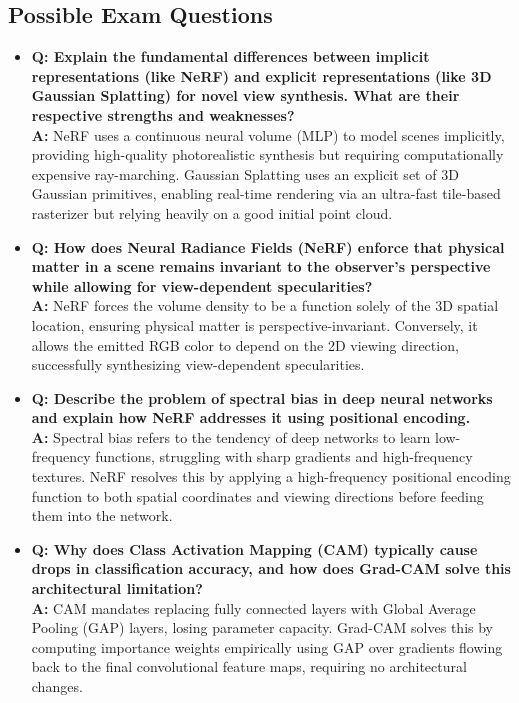 \subsection{Possible Exam Questions}
\begin{itemize}
    \item \textbf{Q: Explain the fundamental differences between implicit representations (like NeRF) and explicit representations (like 3D Gaussian Splatting) for novel view synthesis. What are their respective strengths and weaknesses?} \\
    \textbf{A:} NeRF uses a continuous neural volume (MLP) to model scenes implicitly, providing high-quality photorealistic synthesis but requiring computationally expensive ray-marching. Gaussian Splatting uses an explicit set of 3D Gaussian primitives, enabling real-time rendering via an ultra-fast tile-based rasterizer but relying heavily on a good initial point cloud.
    \item \textbf{Q: How does Neural Radiance Fields (NeRF) enforce that physical matter in a scene remains invariant to the observer's perspective while allowing for view-dependent specularities?} \\
    \textbf{A:} NeRF forces the volume density to be a function solely of the 3D spatial location, ensuring physical matter is perspective-invariant. Conversely, it allows the emitted RGB color to depend on the 2D viewing direction, successfully synthesizing view-dependent specularities.
    \item \textbf{Q: Describe the problem of spectral bias in deep neural networks and explain how NeRF addresses it using positional encoding.} \\
    \textbf{A:} Spectral bias refers to the tendency of deep networks to learn low-frequency functions, struggling with sharp gradients and high-frequency textures. NeRF resolves this by applying a high-frequency positional encoding function to both spatial coordinates and viewing directions before feeding them into the network.
    \item \textbf{Q: Why does Class Activation Mapping (CAM) typically cause drops in classification accuracy, and how does Grad-CAM solve this architectural limitation?} \\
    \textbf{A:} CAM mandates replacing fully connected layers with Global Average Pooling (GAP) layers, losing parameter capacity. Grad-CAM solves this by computing importance weights empirically using GAP over gradients flowing back to the final convolutional feature maps, requiring no architectural changes.

\end{itemize}
